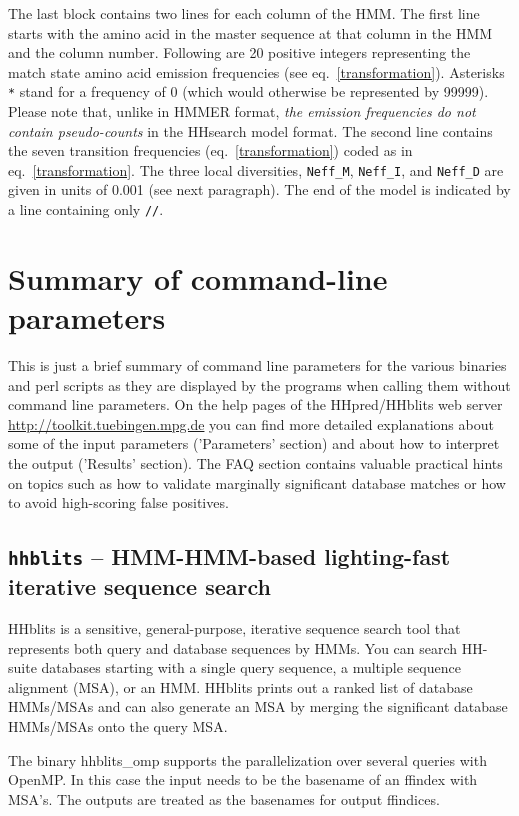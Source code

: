 \documentclass[11pt,a4paper]{article}
\begin{document}
 The last block contains two lines for each column of the HMM. The first line starts with the amino acid in the master sequence at that column in the HMM and the column number. Following are 20  positive integers representing the match state amino acid emission frequencies (see eq.\ \ref{transformation}). Asterisks \verb`*` stand for a frequency of 0 (which would otherwise be represented by 99999). Please note that, unlike in HMMER format,  \emph{the emission frequencies do not contain pseudo-counts} in the HHsearch model format. The second line contains the seven transition frequencies (eq.\ \ref{transformation}) coded as in eq.\ \ref{transformation}. The three local diversities, \verb`Neff_M`, \verb`Neff_I`, and \verb`Neff_D` are given in units of 0.001 (see next paragraph). The end of the model is indicated by a line containing only \verb`//`.


\section{Summary of command-line parameters}

This is just a brief summary of command line parameters for the various binaries and
perl scripts as they are displayed by the programs when calling them without 
command line parameters. On the help pages of the HHpred/HHblits web server
\url{http://toolkit.tuebingen.mpg.de} you can find more detailed explanations
about some of the input parameters  ('Parameters' section) and about how to interpret
the output ('Results' section). The FAQ section contains valuable practical hints on topics
such as how to validate marginally significant database matches or how to avoid high-scoring
false positives.


\subsection{{\tt hhblits} -- HMM-HMM-based lighting-fast iterative sequence search}

HHblits is a sensitive, general-purpose, iterative sequence search tool that represents
both query and database sequences by HMMs. You can search HH-suite databases starting
with a single query sequence, a multiple sequence alignment (MSA), or an HMM. HHblits
prints out a ranked list of database HMMs/MSAs and can also generate an MSA by merging
the significant database HMMs/MSAs onto the query MSA.

The binary hhblits\_omp supports the parallelization over several queries with OpenMP.
In this case the input needs to be the basename of an ffindex with MSA's.
The outputs are treated as the basenames for output ffindices.
\end{document}

